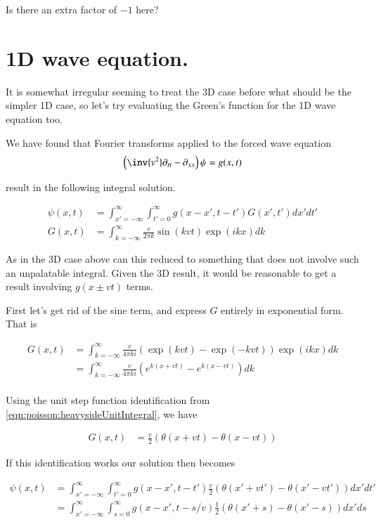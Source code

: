 Is there an extra factor of $-1$ here?

\section{1D wave equation. }

It is somewhat irregular seeming to treat the 3D case before what should be the simpler 1D case, so let's
try evaluating the Green's function for the 1D wave equation too.

We have found that Fourier transforms applied to the forced wave equation
\begin{align}
\left( \inv{v^2} \partial_{tt} -\partial_{xx} \right)\psi = g(x,t)
\end{align}

result in the following integral solution.

\begin{align}\label{eqn:poisson:oneDimResult}
{\psi}(x, t)
&=
\int_{x'=-\infty}^\infty
\int_{t' = 0}^\infty {g}(x-x', t-t') G(x', t') dx' dt' \\
G(x, t) &=
\int_{k = -\infty}^\infty
\frac{v}{2\pi {k}}
\sin( {k} v t )
\exp( i k x )
dk
\end{align}

As in the 3D case above can this reduced to something that does not involve such an unpalatable integral.
Given the 3D result, it would be reasonable to get a result involving $g(x \pm vt)$ terms.

First let's get rid of the sine term, and express $G$ entirely in exponential form.  That is

\begin{align*}
G(x, t)
&=
\int_{k = -\infty}^\infty
\frac{v}{4\pi k i }
\left(\exp( {k} v t ) -\exp( -{k} v t )\right) \exp( i k x )
dk \\
&=
\int_{k = -\infty}^\infty
\frac{v}{4\pi k i }
\left(e^{ {k} (x + v t ) } - e^{ {k} (x - v t) }\right) 
dk \\
\end{align*}

Using the unit step function identification from \ref{eqn:poisson:heavysideUnitIntegral}, we have

\begin{align}
G(x, t) &= \frac{v}{2} \left(\theta(x + v t )  - \theta(x - v t) \right) 
\end{align}

If this identification works our solution then becomes

\begin{align*}
{\psi}(x, t)
&=
\int_{x'=-\infty}^\infty
\int_{t'= 0}^\infty
{g}(x-x', t-t')
\frac{v}{2} \left(\theta(x' + v t' )  - \theta(x' - v t') \right) 
dx' dt' \\
&=
\int_{x'=-\infty}^\infty
\int_{s= 0}^\infty
{g}(x-x', t-s/v)
\frac{1}{2} \left(\theta(x' + s )  - \theta(x' - s) \right) 
dx' ds
\end{align*}

